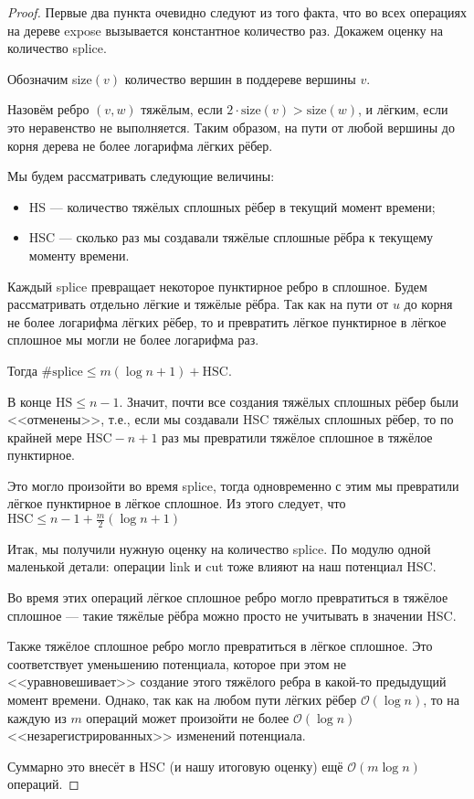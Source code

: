 \begin{proof}

Первые два пункта очевидно следуют из того факта, что во всех операциях на дереве expose вызывается константное количество раз. Докажем оценку на количество splice.

Обозначим size$(v)$ количество вершин в поддереве вершины $v$.

Назовём ребро $(v, w)$ тяжёлым, если $2 \cdot \text{size}(v) > \text{size}(w)$, и лёгким, если это неравенство не выполняется. Таким образом, на пути от любой вершины до корня дерева не более логарифма лёгких рёбер.

Мы будем рассматривать следующие величины:

\begin{itemize}
    \item HS --- количество тяжёлых сплошных рёбер в текущий момент времени;
    \item HSC --- сколько раз мы создавали тяжёлые сплошные рёбра к текущему моменту времени.
\end{itemize}

Каждый splice превращает некоторое пунктирное ребро в сплошное. Будем рассматривать отдельно лёгкие и тяжёлые рёбра. Так как на пути от $u$ до корня не более логарифма лёгких рёбер, то и превратить лёгкое пунктирное в лёгкое сплошное мы могли не более логарифма раз.

Тогда $\# \text{splice} \leq m (\log{n} + 1) + \text{HSC}$.

В конце $\text{HS} \leq n - 1$. Значит, почти все создания тяжёлых сплошных рёбер были <<отменены>>, т.е., если мы создавали HSC тяжёлых сплошных рёбер, то по крайней мере $\text{HSC} - n + 1$ раз мы превратили тяжёлое сплошное в тяжёлое пунктирное.

Это могло произойти во время splice, тогда одновременно с этим мы превратили лёгкое пунктирное в лёгкое сплошное. Из этого следует, что $\text{HSC} \leq n - 1 + \frac{m}{2}(\log{n} + 1)$

Итак, мы получили нужную оценку на количество splice. По модулю одной маленькой детали: операции link и cut тоже влияют на наш потенциал HSC.

Во время этих операций лёгкое сплошное ребро могло превратиться в тяжёлое сплошное --- такие тяжёлые рёбра можно просто не учитывать в значении HSC.

Также тяжёлое сплошное ребро могло превратиться в лёгкое сплошное. Это соответствует уменьшению потенциала, которое при этом не <<уравновешивает>> создание этого тяжёлого ребра в какой-то предыдущий момент времени. Однако, так как на любом пути лёгких рёбер $\mathcal{O}(\log{n})$, то на каждую из $m$ операций может произойти не более $\mathcal{O}(\log{n})$ <<незарегистрированных>> изменений потенциала.

Суммарно это внесёт в HSC (и нашу итоговую оценку) ещё $\mathcal{O}(m \log{n})$ операций.

\end{proof}


